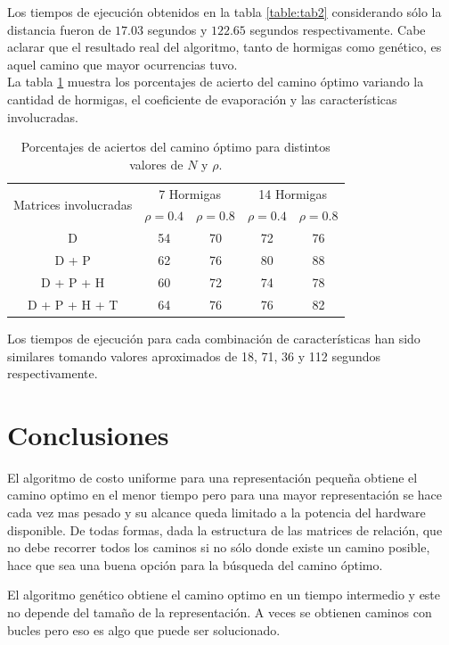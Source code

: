 \documentclass[conference,a4paper,10pt,oneside,final]{tfmpd}
\begin{document}
Los tiempos de ejecución obtenidos en la tabla \ref{table:tab2} considerando sólo la distancia fueron de $17.03$ segundos y $122.65$ segundos respectivamente.
Cabe aclarar que el resultado real del algoritmo, tanto de hormigas como genético, es aquel camino que mayor ocurrencias tuvo. \\

La tabla \ref{table:tab3} muestra los porcentajes de acierto del camino óptimo variando la cantidad de hormigas, el coeficiente de evaporación y las características involucradas.

\begin{table}[!h]
\begin{center}
\begin{tabular}[c]{ccccc} \toprule
\multirow{2}{*}{Matrices involucradas}
& \multicolumn{2}{c}{7 Hormigas} 
& \multicolumn{2}{c}{14 Hormigas} \\
& $\rho=0.4$ & $\rho=0.8$ & $\rho=0.4$ & $\rho=0.8$ \\  \midrule
D             & 54 & 70 & 72 & 76 \\
D + P         & 62 & 76 & 80 & 88 \\
D + P + H     & 60 & 72 & 74 & 78 \\
D + P + H + T & 64 & 76 & 76 & 82 \\ \bottomrule    
\end{tabular}
\end{center}
\caption{Porcentajes de aciertos del camino óptimo para distintos valores de $N$ y $\rho$.}
\label{table:tab3}
\end{table}

Los tiempos de ejecución para cada combinación de características han sido similares tomando valores aproximados de 18, 71, 36 y 112 segundos respectivamente.

\section{Conclusiones}

El algoritmo de costo uniforme para una representación pequeña obtiene el camino optimo en el menor tiempo pero para una mayor representación se hace cada vez mas pesado y su alcance queda limitado a la potencia del hardware disponible. De todas formas, dada la estructura de las matrices de relación, que no debe recorrer todos los caminos si no sólo donde existe un camino posible, hace que sea una buena opción para la búsqueda del camino óptimo.

El algoritmo genético obtiene el camino optimo en un tiempo intermedio y este no depende del tamaño de la representación. A veces se obtienen caminos con bucles pero eso es algo que puede ser solucionado. 
\end{document}

